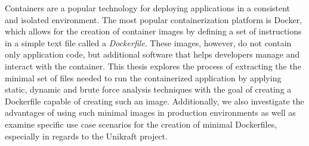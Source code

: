
Containers are a popular technology for deploying applications in a consistent and isolated environment.
The most popular containerization platform is Docker, which allows for the creation of container images by
defining a set of instructions in a simple text file called a \textit{Dockerfile}.
These images, however, do not contain only application code, but additional software that helps developers
manage and interact with the container.
This thesis explores the process of extracting the the minimal set of files needed to run the containerized application by
applying static, dynamic and brute force analysis techniques with the goal of creating a Dockerfile capable of creating such an image.
Additionally, we also investigate the advantages of using such minimal images in production environments as well as examine specific use
case scenarios for the creation of minimal Dockerfiles, especially in regards to the Unikraft project.
